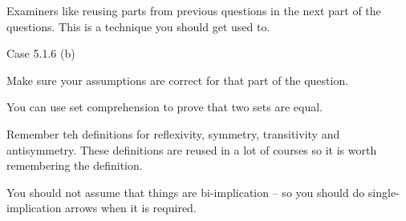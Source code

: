 \documentclass[10pt,\jkfside,a4paper]{article}
\begin{document}
Examiners like reusing parts from previous questions in the next part of the questions. This is a technique you should get used to.

Case 5.1.6 (b)

Make sure your assumptions are correct for that part of the question.

You can use set comprehension to prove that two sets are equal.

Remember teh definitions for reflexivity, symmetry, transitivity and antisymmetry. 
These definitions are reused in a lot of courses so it is worth remembering the definition.

You should not assume that things are bi-implication -- so you should do single-implication arrows when it is required.
\end{document}
